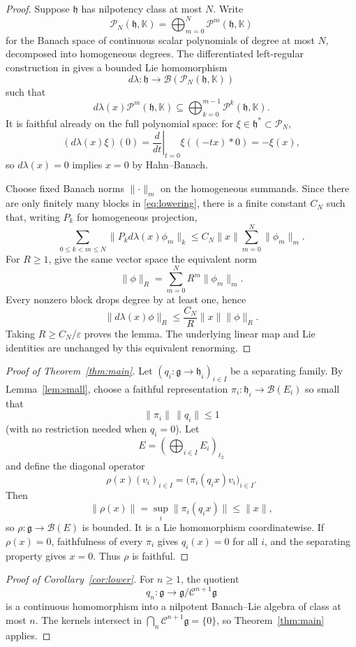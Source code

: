 \documentclass[11pt]{article}
\theoremstyle{definition}
\theoremstyle{remark}
\newcommand{\K}{\mathbb K}
\newcommand{\B}{\mathcal B}
\newcommand{\Pcal}{\mathcal P}
\newcommand{\g}{\mathfrak g}
\newcommand{\h}{\mathfrak h}
\newcommand{\Cen}{\mathcal C}
\newcommand{\norm}[1]{\lVert #1\rVert}
\begin{document}
\begin{proof}
Suppose $\h$ has nilpotency class at most $N$. Write
\[
 \Pcal_N(\h,\K)=\bigoplus_{m=0}^N\Pcal^m(\h,\K)
\]
for the Banach space of continuous scalar polynomials of degree at most $N$,
decomposed into homogeneous degrees. The differentiated left-regular
construction in \cite[Lemmas 2.11--2.12 and Corollary 2.14]{BB} gives a
bounded Lie homomorphism
\[
 d\lambda:\h\longrightarrow\B(\Pcal_N(\h,\K))
\]
such that
\begin{equation}\label{eq:lowering}
 d\lambda(x)\Pcal^m(\h,\K)
 \subseteq\bigoplus_{k=0}^{m-1}\Pcal^k(\h,\K).
\end{equation}
It is faithful already on the full polynomial space: for
$\xi\in\h^*\subset\Pcal_N$,
\[
 (d\lambda(x)\xi)(0)
 =\left.\frac{d}{dt}\right|_{t=0}\xi((-tx)*0)=-\xi(x),
\]
so $d\lambda(x)=0$ implies $x=0$ by Hahn--Banach.

Choose fixed Banach norms $\norm{\cdot}_m$ on the homogeneous summands. Since
there are only finitely many blocks in \eqref{eq:lowering}, there is a finite
constant $C_N$ such that, writing $P_k$ for homogeneous projection,
\[
 \sum_{0\le k<m\le N}
 \norm{P_kd\lambda(x)\phi_m}_k
 \le C_N\norm{x}\sum_{m=0}^N\norm{\phi_m}_m.
\]
For $R\ge1$, give the same vector space the equivalent norm
\[
 \norm{\phi}_R=\sum_{m=0}^N R^m\norm{\phi_m}_m.
\]
Every nonzero block drops degree by at least one, hence
\[
 \norm{d\lambda(x)\phi}_R
 \le \frac{C_N}{R}\norm{x}\norm{\phi}_R.
\]
Taking $R\ge C_N/\varepsilon$ proves the lemma. The underlying linear map
and Lie identities are unchanged by this equivalent renorming.
\end{proof}

\begin{proof}[Proof of Theorem~\ref{thm:main}]
Let $(q_i:\g\to\h_i)_{i\in I}$ be a separating family. By
Lemma~\ref{lem:small}, choose a faithful representation
$\pi_i:\h_i\to\B(E_i)$ so small that
\[
 \norm{\pi_i}\,\norm{q_i}\le1
\]
(with no restriction needed when $q_i=0$). Let
\[
 E=\left(\bigoplus_{i\in I}E_i\right)_{\ell_2}
\]
and define the diagonal operator
\[
 \rho(x)(v_i)_{i\in I}
   =\big(\pi_i(q_i x)v_i\big)_{i\in I}.
\]
Then
\[
 \norm{\rho(x)}=\sup_i\norm{\pi_i(q_i x)}\le\norm{x},
\]
so $\rho:\g\to\B(E)$ is bounded. It is a Lie homomorphism coordinatewise.
If $\rho(x)=0$, faithfulness of every $\pi_i$ gives $q_i(x)=0$ for all
$i$, and the separating property gives $x=0$. Thus $\rho$ is faithful.
\end{proof}

\begin{proof}[Proof of Corollary~\ref{cor:lower}]
For $n\ge1$, the quotient
\[
 q_n:\g\longrightarrow\g/\Cen^{n+1}\g
\]
is a continuous homomorphism into a nilpotent Banach--Lie algebra of class at
most $n$. The kernels intersect in $\bigcap_n\Cen^{n+1}\g=\{0\}$, so
Theorem~\ref{thm:main} applies.
\end{proof}
\end{document}
